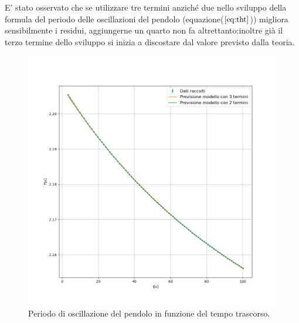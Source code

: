 \documentclass{article}
\begin{document}
E' stato osservato che se utilizzare tre termini anziché due nello sviluppo della formula del periodo delle oscillazioni del pendolo (equazione($\ref{eq:tht}$)) migliora sensibilmente i residui, aggiungerne un quarto non fa altrettanto:inoltre già il terzo termine dello sviluppo si inizia a discostare dal valore previsto dalla teoria.

\begin{figure}[h!]
	\includegraphics[width=\textwidth]{plot_Periods-time.png}
	\caption{Periodo di oscillazione del pendolo in funzione del tempo trascorso.}
	\label{fig:pt}
\end{figure}
\end{document}
